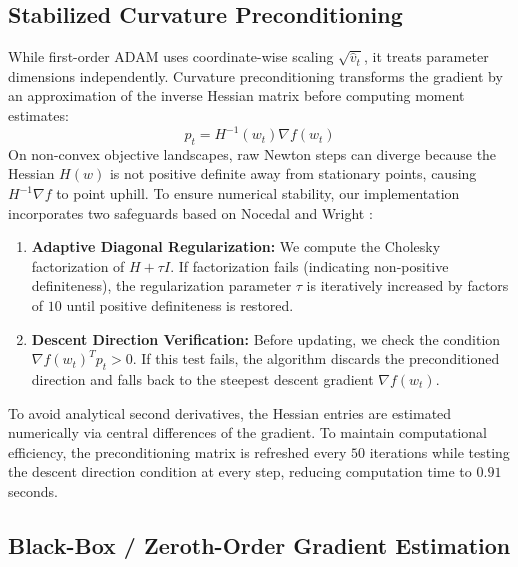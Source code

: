 \documentclass[11pt,a4paper]{article}
\newcommand{\added}[1]{#1}
\begin{document}
\added{\subsection{Stabilized Curvature Preconditioning}}

\added{While first-order ADAM uses coordinate-wise scaling $\sqrt{\hat{v}_t}$, it treats parameter dimensions independently. Curvature preconditioning transforms the gradient by an approximation of the inverse Hessian matrix before computing moment estimates:}
\added{\begin{equation}
    p_t = H^{-1}(w_t) \nabla f(w_t)
\end{equation}}
\added{On non-convex objective landscapes, raw Newton steps can diverge because the Hessian $H(w)$ is not positive definite away from stationary points, causing $H^{-1} \nabla f$ to point uphill. To ensure numerical stability, our implementation incorporates two safeguards based on Nocedal and Wright \cite{nocedal2006numerical}:}
\added{\begin{enumerate}
    \item \textbf{Adaptive Diagonal Regularization:} We compute the Cholesky factorization of $H + \tau I$. If factorization fails (indicating non-positive definiteness), the regularization parameter $\tau$ is iteratively increased by factors of $10$ until positive definiteness is restored.
    \item \textbf{Descent Direction Verification:} Before updating, we check the condition $\nabla f(w_t)^T p_t > 0$. If this test fails, the algorithm discards the preconditioned direction and falls back to the steepest descent gradient $\nabla f(w_t)$.
\end{enumerate}}
\added{To avoid analytical second derivatives, the Hessian entries are estimated numerically via central differences of the gradient. To maintain computational efficiency, the preconditioning matrix is refreshed every $50$ iterations while testing the descent direction condition at every step, reducing computation time to $0.91$ seconds.}

\added{\subsection{Black-Box / Zeroth-Order Gradient Estimation}}
\end{document}
